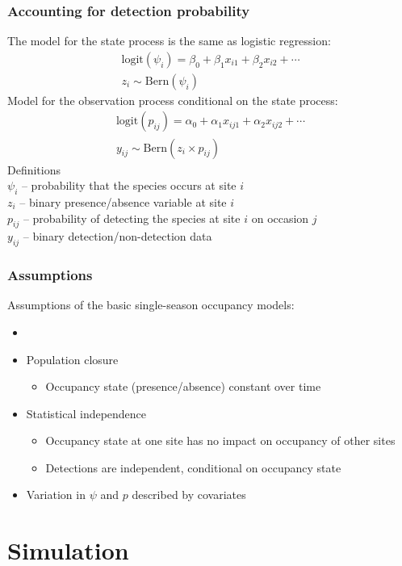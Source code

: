 \documentclass[color=usenames,dvipsnames]{beamer}\usepackage[]{graphicx}\usepackage[]{xcolor}
\begin{document}
\begin{frame}
  \frametitle{Accounting for detection probability}
  \small
  The model for the state process is the same as logistic regression:
  \begin{gather*}
    \mathrm{logit}(\psi_i) = \beta_0 + \beta_1 x_{i1} + \beta_2 x_{i2} + \cdots \\
    z_i \sim \mathrm{Bern}(\psi_i)
  \end{gather*}
  \pause
  \vfill
  Model for the observation process conditional on the state process:
  \begin{gather*}
    \mathrm{logit}(p_{ij}) = \alpha_0 + \alpha_1 x_{ij1} + \alpha_2 x_{ij2} + \cdots \\
    y_{ij} \sim \mathrm{Bern}(z_i\times p_{ij})
  \end{gather*}
  \pause
  Definitions \\
  $\psi_i$ -- probability that the species occurs at site $i$ \\
  $z_i$ -- binary presence/absence variable at site $i$ \\
  $p_{ij}$ -- probability of detecting the species at site $i$ on occasion $j$ \\
  $y_{ij}$ -- binary detection/non-detection data
\end{frame}


\begin{frame}
  \frametitle{Assumptions}
  Assumptions of the basic single-season occupancy models:
  \begin{itemize}
    \item[]
    \item Population closure
    \begin{itemize}
      \item Occupancy state (presence/absence) constant over time
    \end{itemize}
    \item Statistical independence
    \begin{itemize}
      \item Occupancy state at one site has no impact on occupancy of other sites
      \item Detections are independent, conditional on occupancy state    
    \end{itemize}
    \item Variation in $\psi$ and $p$ described by covariates
  \end{itemize}
\end{frame}


\section{Simulation}
\end{document}
